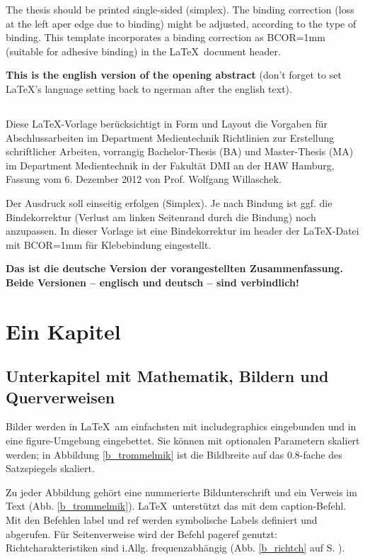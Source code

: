 The thesis should be printed single-sided (simplex). The binding correction (loss at the left aper edge due to binding) might be adjusted, according to the type of binding. This template incorporates a binding correction as BCOR=1mm (suitable for adhesive binding) in the \LaTeX\ document header.

{\bfseries This is the english version of the opening abstract} (don't forget to set \LaTeX's language setting back to ngerman after the english text).


\section*{\centering\abstractname}
Diese \LaTeX-Vorlage berücksichtigt in Form und Layout die Vorgaben für Abschlussarbeiten im Department Medientechnik \glqq Richtlinien zur Erstellung schriftlicher Arbeiten, vorrangig Bachelor-Thesis (BA) und Master-Thesis (MA) im Department Medientechnik in der Fakultät DMI an der HAW Hamburg\grqq, Fassung vom 6. Dezember 2012 von Prof. Wolfgang Willaschek.

Der Ausdruck soll einseitig erfolgen (Simplex). Je nach Bindung ist ggf. die Bindekorrektur (Verlust am linken Seitenrand durch die Bindung) noch anzupassen. In dieser Vorlage ist eine Bindekorrektur im header der \LaTeX-Datei mit BCOR=1mm für Klebebindung eingestellt.

{\bfseries Das ist die deutsche Version der vorangestellten Zusammenfassung. Beide Versionen -- englisch und deutsch -- sind verbindlich!}



\chapter{Ein Kapitel}

\section{Unterkapitel mit Mathematik, Bildern und Querverweisen}

Bilder werden in \LaTeX\ am einfachsten mit includegraphics eingebunden und in eine figure-Umgebung eingebettet. Sie können mit optionalen Parametern skaliert werden; in Abbildung \ref{b_trommelmik} ist die Bildbreite auf das 0.8-fache des Satzspiegels skaliert.

Zu jeder Abbildung gehört eine nummerierte Bildunterschrift und ein Verweis im Text (Abb. \ref{b_trommelmik}). \LaTeX\ unterstützt das mit dem caption-Befehl. Mit den Befehlen label und ref werden symbolische Labels definiert und abgerufen. Für Seitenverweise wird der Befehl pageref genutzt: Richtcharakteristiken sind i.Allg. frequenzabhängig (Abb. \ref{b_richtch} auf S. \pageref{b_richtch}).

